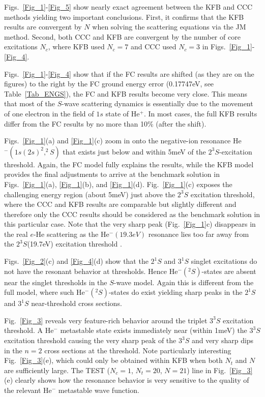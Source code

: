 \documentclass[aip
, pra
, showpacs
, aps
, twocolumn
, groupedaddress
, floatfix
]{revtex4}
\begin{document}
Figs.~\ref{Fig_1}-\ref{Fig_5} show nearly exact agreement between the KFB and CCC methods yielding two important conclusions.
First, it confirms that the KFB results are convergent by $N$ when solving the scattering equations via the JM method.
Second, both CCC and KFB are convergent by the number of core excitations $N_c$, where KFB used $N_c=7$ and CCC used $N_c=3$ in Figs.~\ref{Fig_1}-\ref{Fig_4}.


Figs.~\ref{Fig_1}-\ref{Fig_4} show that if the FC results are shifted (as they are on the figures) to the right by the FC ground energy error (0.17747eV, see Table~\ref{Tab_ENGS}),
the FC and KFB results become very close. This means that most of the $S$-wave scattering dynamics  is essentially due to
the movement of one electron in the field of $1s$ state of He$^+$. In most cases, the full KFB results differ from the FC results by no more than 10\% (after the shift).


Figs.~\ref{Fig_1}(a) and \ref{Fig_1}(c) zoom in onto the negative-ion resonance He$^-(1s(2s)^2,^2S)$ that exists just below and within 5meV of the $2^3S$-excitation threshold.
Again, the FC model fully explains the results, while the KFB model provides the final adjustments to arrive at the benchmark solution in Figs.~\ref{Fig_1}(a), \ref{Fig_1}(b), and \ref{Fig_1}(d).
Fig.~\ref{Fig_1}(c) exposes the challenging energy region (about 5meV) just above the $2^3S$ excitation threshold,
where the CCC and KFB results are comparable but slightly different and therefore only the CCC results should be considered as the benchmark solution in this particular case.
Note that the very sharp peak (Fig.~\ref{Fig_1}c) disappears in the real $e$-He scattering \cite{KM95pL139, HBSBB96} as the He$^-(19.3eV)$ resonance \cite{Schulz73, BC94, HY99}
lies too far away from the $2^3S$(19.7eV) excitation threshold \cite{HBSBB96}.


Figs.~\ref{Fig_2}(c) and \ref{Fig_4}(d) show that the $2^1S$ and $3^1S$ singlet excitations do not have the resonant behavior at thresholds.
Hence He$^-(^2S)$-states are absent near the singlet thresholds in the $S$-wave model.
Again this is different from the full model, where such He$^-(^2S)$-states do exist yielding sharp
peaks in the $2^1S$ \cite{KM95pL139, HBSBB96} and $3^1S$ \cite{SMC2006} near-threshold cross sections.


Fig.~\ref{Fig_3} reveals very feature-rich  behavior around the triplet $3^3S$  excitation threshold.
A He$^-$ metastable state exists immediately near (within 1meV) the  $3^3S$  excitation threshold
causing the very sharp peak of the $3^3S$ and very sharp dips in the $n=2$ cross sections at the threshold.
Note particularly interesting Fig.~\ref{Fig_3}(e), which could only be obtained within KFB when both $N_t$ and $N$ are sufficiently large.
The TEST ($N_c=1$, $N_t=20$, $N=21$) line in Fig.~\ref{Fig_3}(e) clearly shows how the resonance behavior is very sensitive to the quality of the relevant He$^-$ metastable wave function.
\end{document}
